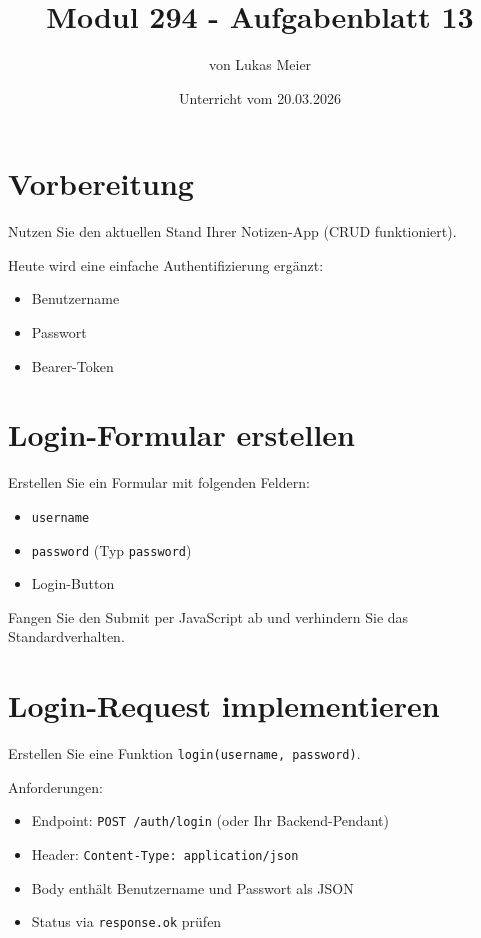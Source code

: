 \documentclass[a4paper,12pt]{article}
\title{Modul 294 - Aufgabenblatt 13}
\author{von Lukas Meier}
\date{Unterricht vom 20.03.2026}
\begin{document}
\maketitle

\section{Vorbereitung}

Nutzen Sie den aktuellen Stand Ihrer Notizen-App (CRUD funktioniert).

Heute wird eine einfache Authentifizierung ergänzt:
\begin{itemize}
    \item Benutzername
    \item Passwort
    \item Bearer-Token
\end{itemize}

\section{Login-Formular erstellen}

Erstellen Sie ein Formular mit folgenden Feldern:
\begin{itemize}
    \item \texttt{username}
    \item \texttt{password} (Typ \texttt{password})
    \item Login-Button
\end{itemize}

Fangen Sie den Submit per JavaScript ab und verhindern Sie das Standardverhalten.

\section{Login-Request implementieren}

Erstellen Sie eine Funktion \texttt{login(username, password)}.

Anforderungen:
\begin{itemize}
    \item Endpoint: \texttt{POST /auth/login} (oder Ihr Backend-Pendant)
    \item Header: \texttt{Content-Type: application/json}
    \item Body enthält Benutzername und Passwort als JSON
    \item Status via \texttt{response.ok} prüfen
\end{itemize}
\end{document}
